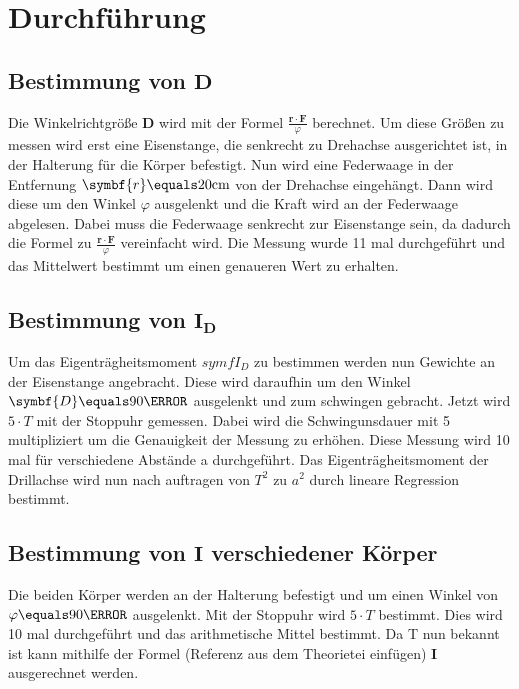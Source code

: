 \section{Durchführung}
\label{sec:Durchführung}
    \subsection{Bestimmung von $\symbf{D}$}
    Die Winkelrichtgröße $\symbf{D}$ wird mit der Formel $\frac{\symbf{r} \cdot \symbf{F}}{\varphi}$ berechnet.
    Um diese Größen zu messen wird erst eine Eisenstange, die senkrecht zu Drehachse ausgerichtet ist, in der Halterung für die Körper befestigt.
    Nun wird eine Federwaage in der Entfernung $\symbf{r}\equals20\unit{\centi\meter}$ von der Drehachse eingehängt.
    Dann wird diese um den Winkel $\varphi$ ausgelenkt und die Kraft wird an der Federwaage abgelesen.
    Dabei muss die Federwaage senkrecht zur Eisenstange sein, da dadurch die Formel zu $\frac{\symbf{r}\cdot\symbf{F}}{\varphi}$ vereinfacht wird.
    Die Messung wurde 11 mal durchgeführt und das Mittelwert bestimmt um einen genaueren Wert zu erhalten.%

    \subsection{Bestimmung von $\symbf{I_D}$}
    Um das Eigenträgheitsmoment $symf{I_D}$ zu bestimmen werden nun Gewichte an der Eisenstange angebracht. 
    Diese wird daraufhin um den Winkel $\symbf{D}\equals90\degree$ ausgelenkt und zum schwingen gebracht.
    Jetzt wird $5 \cdot T$ mit der Stoppuhr gemessen. %
    Dabei wird die Schwingunsdauer mit 5 multipliziert um die Genauigkeit der Messung zu erhöhen. %
    Diese Messung wird 10 mal für verschiedene Abstände a durchgeführt.
    Das Eigenträgheitsmoment der Drillachse wird nun nach auftragen von $T^2$ zu $a^2$ durch lineare Regression bestimmt.%

    \subsection{Bestimmung von $\symbf{I}$ verschiedener Körper}
    Die beiden Körper werden an der Halterung befestigt und um einen Winkel von $\varphi\equals90\degree$ ausgelenkt.
    Mit der Stoppuhr wird $5 \cdot T$ bestimmt. 
    Dies wird 10 mal durchgeführt und das arithmetische Mittel bestimmt.
    Da T nun bekannt ist kann mithilfe der Formel (Referenz aus dem Theorietei einfügen) $\symbf{I}$ ausgerechnet werden.

